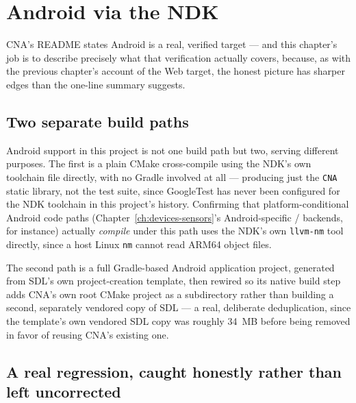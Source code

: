 \chapter{Android via the NDK}
\label{ch:android-ndk}

CNA's README states Android is a real, verified target --- and this chapter's job is to
describe precisely what that verification actually covers, because, as with the previous
chapter's account of the Web target, the honest picture has sharper edges than the one-line
summary suggests.

\section{Two separate build paths}

Android support in this project is not one build path but two, serving different purposes.
The first is a plain CMake cross-compile using the NDK's own toolchain file directly, with no
Gradle involved at all --- producing just the \texttt{CNA} static library, not the test suite,
since GoogleTest has never been configured for the NDK toolchain in this project's history.
Confirming that platform-conditional Android code paths (Chapter~\ref{ch:devices-sensors}'s
Android-specific / backends, for instance) actually
\emph{compile} under this path uses the NDK's own \texttt{llvm-nm} tool directly, since a
host Linux \texttt{nm} cannot read ARM64 object files.

The second path is a full Gradle-based Android application project, generated from SDL's own
project-creation template, then rewired so its native build step adds CNA's own root CMake
project as a subdirectory rather than building a second, separately vendored copy of SDL ---
a real, deliberate deduplication, since the template's own vendored SDL copy was roughly
34~MB before being removed in favor of reusing CNA's existing one.

\section{A real regression, caught honestly rather than left uncorrected}

